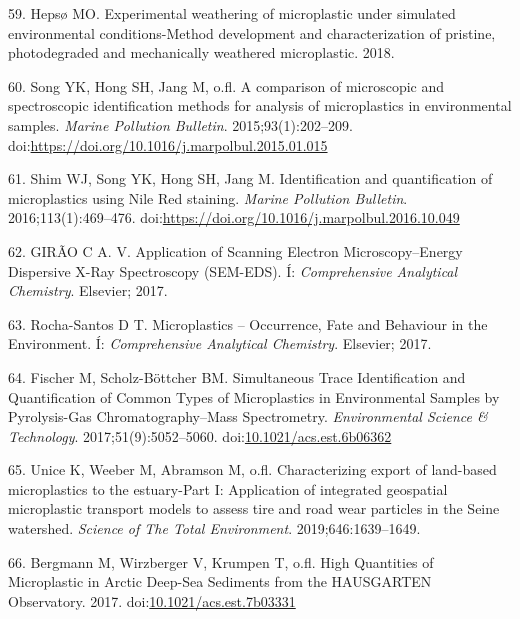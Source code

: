 \documentclass[icelandic,]{book}
\begin{document}
\leavevmode\hypertarget{ref-hepso2018experimental}{}%
59. Hepsø MO. Experimental weathering of microplastic under simulated environmental conditions-Method development and characterization of pristine, photodegraded and mechanically weathered microplastic. 2018.

\leavevmode\hypertarget{ref-SONG2015202}{}%
60. Song YK, Hong SH, Jang M, o.fl. A comparison of microscopic and spectroscopic identification methods for analysis of microplastics in environmental samples. \emph{Marine Pollution Bulletin}. 2015;93(1):202--209. doi:\href{https://doi.org/https://doi.org/10.1016/j.marpolbul.2015.01.015}{https://doi.org/10.1016/j.marpolbul.2015.01.015}

\leavevmode\hypertarget{ref-SHIM2016469}{}%
61. Shim WJ, Song YK, Hong SH, Jang M. Identification and quantification of microplastics using Nile Red staining. \emph{Marine Pollution Bulletin}. 2016;113(1):469--476. doi:\href{https://doi.org/https://doi.org/10.1016/j.marpolbul.2016.10.049}{https://doi.org/10.1016/j.marpolbul.2016.10.049}

\leavevmode\hypertarget{ref-bitam2014bio2}{}%
62. GIRÃO C A. V. Application of Scanning Electron Microscopy--Energy Dispersive X-Ray Spectroscopy (SEM-EDS). Í: \emph{Comprehensive Analytical Chemistry}. Elsevier; 2017.

\leavevmode\hypertarget{ref-k22014bio2}{}%
63. Rocha-Santos D T. Microplastics -- Occurrence, Fate and Behaviour in the Environment. Í: \emph{Comprehensive Analytical Chemistry}. Elsevier; 2017.

\leavevmode\hypertarget{ref-Fischer2017}{}%
64. Fischer M, Scholz-Böttcher BM. Simultaneous Trace Identification and Quantification of Common Types of Microplastics in Environmental Samples by Pyrolysis-Gas Chromatography--Mass Spectrometry. \emph{Environmental Science \& Technology}. 2017;51(9):5052--5060. doi:\href{https://doi.org/10.1021/acs.est.6b06362}{10.1021/acs.est.6b06362}

\leavevmode\hypertarget{ref-unice2019characterizing1}{}%
65. Unice K, Weeber M, Abramson M, o.fl. Characterizing export of land-based microplastics to the estuary-Part I: Application of integrated geospatial microplastic transport models to assess tire and road wear particles in the Seine watershed. \emph{Science of The Total Environment}. 2019;646:1639--1649.

\leavevmode\hypertarget{ref-Bergmann2017}{}%
66. Bergmann M, Wirzberger V, Krumpen T, o.fl. High Quantities of Microplastic in Arctic Deep-Sea Sediments from the HAUSGARTEN Observatory. 2017. doi:\href{https://doi.org/10.1021/acs.est.7b03331}{10.1021/acs.est.7b03331}
\end{document}
